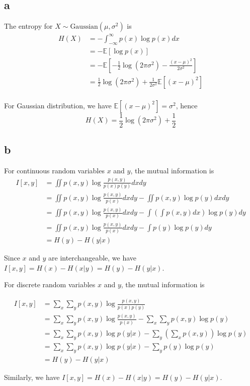 \documentclass[a4paper,12pt]{article}
\begin{document}
\subsection*{a}

The entropy for $X \sim \text{Gaussian}(\mu, \sigma^2)$ is
\begin{align*}
	H(X) &= -\int_{- \infty}^{\infty} p(x) \log p(x) dx \\
	&= - \mathbb{E}[\log p(x)] \\
	&= - \mathbb{E}[-\frac{1}{2} \log(2 \pi \sigma^2) - \frac{(x - \mu)^2}{2 \sigma^2}] \\
	&= \frac{1}{2} \log(2 \pi \sigma^2) + \frac{1}{2 \sigma^2} \mathbb{E}[(x - \mu)^2] \\
\end{align*}

For Gaussian distribution, we have $\mathbb{E}[(x - \mu)^2] = \sigma^2$, hence
\begin{equation*}
	H(X) = \frac{1}{2} \log(2 \pi \sigma^2) + \frac{1}{2}
\end{equation*}

\subsection*{b}

For continuous random variables $x$ and $y$, the mutual information is
\begin{align*}
	I[x, y] &= \iint p(x, y) \log \frac{p(x, y)}{p(x) p(y)} dx dy \\
	&= \iint p(x, y) \log \frac{p(x, y)}{p(x)} dx dy - \iint p(x, y) \log p(y) dx dy \\
	&= \iint p(x, y) \log \frac{p(x, y)}{p(x)} dx dy - \int \left( \int p(x, y) dx \right) \log p(y) dy \\
	&= \iint p(x, y) \log \frac{p(x, y)}{p(x)} dx dy - \int p(y) \log p(y) dy \\
	&= H(y) - H(y | x)
\end{align*}

Since $x$ and $y$ are interchangeable, we have $I[x, y] = H(x) - H(x | y) = H(y) - H(y | x)$.

For discrete random variables $x$ and $y$, the mutual information is

\begin{align*}
	I[x, y] &= \sum_x \sum_y p(x, y) \log \frac{p(x, y)}{p(x) p(y)} \\
	&= \sum_x \sum_y p(x, y) \log \frac{p(x, y)}{p(x)} - \sum_x \sum_y p(x, y) \log p(y) \\
	&= \sum_x \sum_y p(x, y) \log p(y | x) - \sum_y \left( \sum_x p(x, y) \right) \log p(y) \\
	&= \sum_x \sum_y p(x, y) \log p(y | x) - \sum_y p(y) \log p(y) \\
	&= H(y) - H(y | x)
\end{align*}

Similarly, we have $I[x, y] = H(x) - H(x | y) = H(y) - H(y | x)$.
\end{document}

